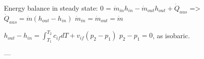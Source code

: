 Energy balance in steady state:  
0 = \( \dot{m}_{in} h_{in} - \dot{m}_{out} h_{out} + \dot{Q}_{aus} \)  
=> \( \dot{Q}_{aus} = \dot{m} (h_{out} - h_{in}) \)  
\( \dot{m}_{in} = \dot{m}_{out} = \dot{m} \)  

\( h_{out} - h_{in} = \int_{T_1}^{T_2} c_{if} dT + v_{if} (p_2 - p_1) \)  
\( p_2 - p_1 = 0 \), as isobaric.  

---